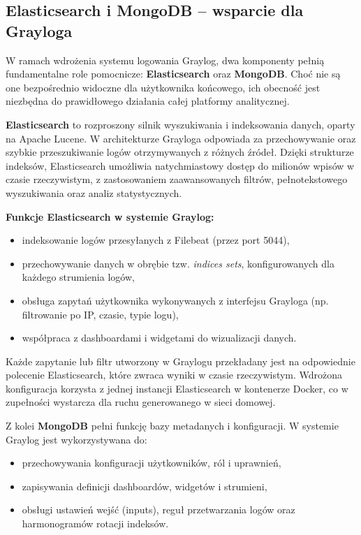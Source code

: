 \documentclass[
    left=2.5cm,         %
    right=2.5cm,        %
    top=2.5cm,          %
    bottom=3cm,         %
    bindingoffset=6mm,  %
    nohyphenation=true %
]{eiti/eiti-thesis} %
\begin{document}
\subsection{Elasticsearch i MongoDB – wsparcie dla Grayloga}

W ramach wdrożenia systemu logowania Graylog, dwa komponenty pełnią fundamentalne role pomocnicze: \textbf{Elasticsearch} oraz \textbf{MongoDB}\cite{mongodb}. Choć nie są one bezpośrednio widoczne dla użytkownika końcowego, ich obecność jest niezbędna do prawidłowego działania całej platformy analitycznej.

\textbf{Elasticsearch} to rozproszony silnik wyszukiwania i indeksowania danych, oparty na Apache Lucene\cite{lucene}. W architekturze Grayloga odpowiada za przechowywanie oraz szybkie przeszukiwanie logów otrzymywanych z różnych źródeł. Dzięki strukturze indeksów, Elasticsearch umożliwia natychmiastowy dostęp do milionów wpisów w czasie rzeczywistym, z zastosowaniem zaawansowanych filtrów, pełnotekstowego wyszukiwania oraz analiz statystycznych.

\textbf{Funkcje Elasticsearch w systemie Graylog:}
\begin{itemize}
    \item indeksowanie logów przesyłanych z Filebeat (przez port 5044),
    \item przechowywanie danych w obrębie tzw. \textit{indices sets}, konfigurowanych dla każdego strumienia logów,
    \item obsługa zapytań użytkownika wykonywanych z interfejsu Grayloga (np. filtrowanie po IP, czasie, typie logu),
    \item współpraca z dashboardami i widgetami do wizualizacji danych.
\end{itemize}

Każde zapytanie lub filtr utworzony w Graylogu przekładany jest na odpowiednie polecenie Elasticsearch, które zwraca wyniki w czasie rzeczywistym. Wdrożona konfiguracja korzysta z jednej instancji Elasticsearch w kontenerze Docker, co w zupełności wystarcza dla ruchu generowanego w sieci domowej.

Z kolei \textbf{MongoDB} pełni funkcję bazy metadanych i konfiguracji. W systemie Graylog jest wykorzystywana do:
\begin{itemize}
    \item przechowywania konfiguracji użytkowników, ról i uprawnień,
    \item zapisywania definicji dashboardów, widgetów i strumieni,
    \item obsługi ustawień wejść (inputs), reguł przetwarzania logów oraz harmonogramów rotacji indeksów.
\end{itemize}
\end{document}
